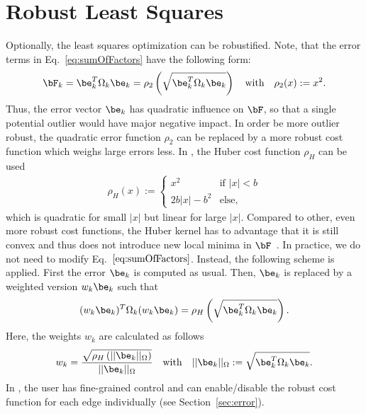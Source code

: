 \documentclass[a4paper]{article}
\begin{document}
\section{Robust Least Squares\label{sec:robust_kernel}}
Optionally, the least squares optimization can be robustified.
Note, that the error terms in Eq.~\ref{eq:sumOfFactors}  have the following form:
\begin{eqnarray}
\bF_k = \be_k^T\Omega_k \be_k = \rho_2\left(\sqrt{\be_k^T\Omega_k \be_k}\right) \quad \text{with} \quad \rho_2(x):=x^2.
\end{eqnarray}
Thus, the error vector $\be_k$ has quadratic influence on $\bF$, 
so that a single potential outlier would have major negative impact.
In order be more outlier robust, the quadratic error function $\rho_2$
can be replaced by a more robust cost function which weighs large errors less. 
In \gopt, the Huber cost function $\rho_H$ can be used
\begin{eqnarray}
\rho_H(x) := \begin{cases}
                 x^2         & \text{if } |x|<b\\
                  2b |x| - b^2          & \text{else},
   \end{cases}
\end{eqnarray}
which is quadratic for small $|x|$ but linear for large $|x|$. Compared to other,
even more robust cost functions, the Huber kernel has to advantage that it is
still convex and thus does not introduce new local minima in $\bF$~\cite[pp.616]{Hartley:Zisserman:Book2004}.
In practice, we do not need to modify Eq.~$\ref{eq:sumOfFactors}$. Instead, the following scheme 
is applied. First the  error $\be_k$ is computed as usual. Then, $\be_k$ is replaced by 
a weighted version $w_k\be_k$ such that 
\begin{eqnarray}
(w_k\be_k)^T\Omega_k (w_k\be_k) = \rho_H\left(\sqrt{\be_k^T\Omega_k \be_k}\right).
\end{eqnarray}
Here, the weights $w_k$ are calculated as follows
\begin{eqnarray}
w_k = \frac{\sqrt{\rho_H\left(||\be_k||_\Omega \right)}}{||\be_k||_\Omega } \quad \text{with} \quad ||\be_k||_\Omega := \sqrt{\be_k^T\Omega_k \be_k}.
\end{eqnarray}
In \gopt, the user has fine-grained control and can enable/disable the robust cost function for each edge individually (see Section~\ref{sec:error}).
\end{document}
